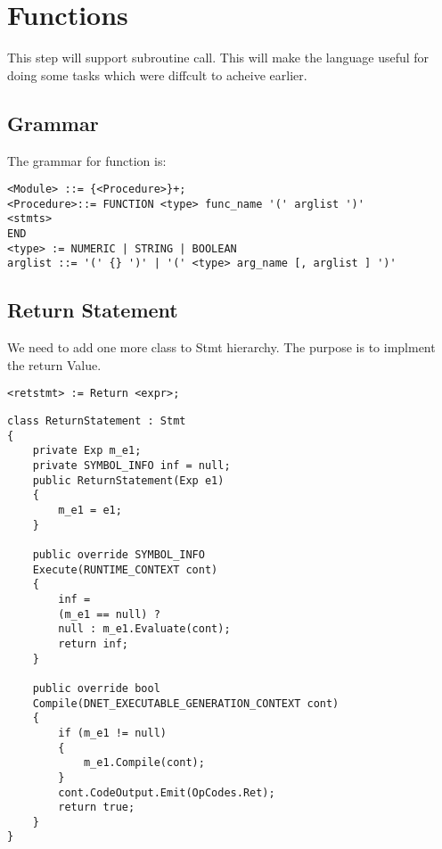 \chapter{Functions}
This step will support subroutine call. This will make the language useful for doing some tasks which were diffcult to acheive earlier.
\section{Grammar}
The grammar for function is:
\lstset{style=csharp}
\begin{lstlisting}
<Module> ::= {<Procedure>}+;
<Procedure>::= FUNCTION <type> func_name '(' arglist ')'
<stmts>
END
<type> := NUMERIC | STRING | BOOLEAN
arglist ::= '(' {} ')' | '(' <type> arg_name [, arglist ] ')'
\end{lstlisting}

\section{Return Statement}
We need to add one more class to Stmt hierarchy. The purpose is to implment the return Value.
\begin{verbatim}
<retstmt> := Return <expr>;
\end{verbatim}
\lstset{style=csharp}
\begin{lstlisting}
class ReturnStatement : Stmt
{
	private Exp m_e1;
	private SYMBOL_INFO inf = null;
	public ReturnStatement(Exp e1)
	{
		m_e1 = e1;
	}
	
	public override SYMBOL_INFO 
	Execute(RUNTIME_CONTEXT cont)
	{
		inf = 
		(m_e1 == null) ? 
		null : m_e1.Evaluate(cont);
		return inf;
	}

	public override bool 
	Compile(DNET_EXECUTABLE_GENERATION_CONTEXT cont)
	{
		if (m_e1 != null)
		{
			m_e1.Compile(cont);
		}
		cont.CodeOutput.Emit(OpCodes.Ret);
		return true;
	}
}
\end{lstlisting}

